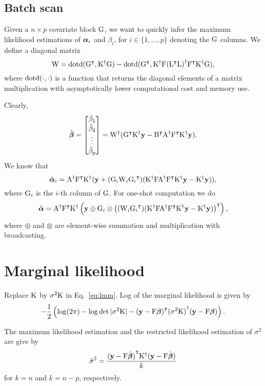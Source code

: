 \documentclass[twocolumn,draft]{article}
\begin{document}
\subsection{Batch scan}

Given a $n\times p$ covariate block $\mathrm{G}$, we want to quickly infer the
maximum likelihood estimations of $\boldsymbol{\alpha}_i$ and $\beta_i$, for
$i \in \{1, \dots, p\}$ denoting the $\mathrm{G}$ columns.
We define a diagonal matrix
\begin{equation*}
	\mathrm{W} = \mathrm{dotd} ({\mathrm{G}}^\intercal, {\mathrm{K}}^{\dagger}\mathrm{G}) -
	       \mathrm{dotd} ({\mathrm{G}}^\intercal, {\mathrm{K}}^{\dagger}\mathrm{F}
				 {({\mathrm{L}}^\intercal\mathrm{L})}^{\dagger}{\mathrm{F}}^\intercal{\mathrm{K}}^{\dagger}\mathrm{G}),
\end{equation*}
where $\mathrm{dotd} (\cdot, \cdot)$ is a function that returns the diagonal elements
of a matrix multiplication with asymptotically lower computational cost and
memory use.

Clearly,
\begin{equation*}
	\hat{\boldsymbol{\beta}} =
	\begin{bmatrix}
		\hat\beta_1 \\
		\hat\beta_2 \\
		\vdots \\
		\hat\beta_p
	\end{bmatrix}
	= {\mathrm{W}}^{\dagger}({\mathrm{G}}^\intercal{\mathrm{K}}^{\dagger}\mathbf{y}
	-{\mathrm{B}}^\intercal{\mathrm{A}}^{\dagger}{\mathrm{F}}^\intercal{\mathrm{K}}^{\dagger}\mathbf{y}).
\end{equation*}
We know that
\begin{equation*}
	\hat{\boldsymbol{\alpha}}_i = {\mathrm{A}}^{\dagger}{\mathrm{F}}^\intercal{\mathrm{K}}^{\dagger}
	(\mathbf{y} + (\mathrm{G}_i \mathrm{W}_i {\mathrm{G}_i}^\intercal)
	({\mathrm{K}}^{\dagger}\mathrm{F}{\mathrm{A}}^{\dagger}{\mathrm{F}}^\intercal{\mathrm{K}}^{\dagger}\mathbf{y} - {\mathrm{K}}^{\dagger}\mathbf{y})),
\end{equation*}
where $\mathrm{G}_i$ is the $i$-th column of $\mathrm{G}$.
For one-shot computation we do
\begin{equation*}
	\hat{\boldsymbol{\alpha}} = {\mathrm{A}}^{\dagger}{\mathrm{F}}^\intercal{\mathrm{K}}^{\dagger}
	\left(\mathbf{y} \oplus \mathrm{G}_i \otimes
	{\left((\mathrm{W}_i {\mathrm{G}_i}^\intercal)
	  ({\mathrm{K}}^{\dagger}\mathrm{F}{\mathrm{A}}^{\dagger}{\mathrm{F}}^\intercal{\mathrm{K}}^{\dagger}\mathbf{y}- {\mathrm{K}}^{\dagger}\mathbf{y})\right)}^\intercal\right),
\end{equation*}
where $\oplus$ and $\otimes$ are element-wise summation and multiplication
with broadcasting.

\section{Marginal likelihood}

Replace $\mathrm{K}$ by $\sigma^2\mathrm{K}$ in Eq.~\eqref{eq:lmm}.
Log of the marginal likelihood is given by
\begin{equation*}
	-\frac{1}{2}\left(\log(2\pi) - \log\det|\sigma^2\mathrm{K}|
	- {(\mathbf{y} - \mathrm{F}\boldsymbol{\beta})}^\intercal {(\sigma^2\mathrm{K})}^{\dagger} (\mathbf{y} - \mathrm{F}\boldsymbol{\beta})\right).
\end{equation*}

The maximum likelihood estimation and the restricted likelihood estimation of
$\sigma^2$ are give by
\begin{equation*}
	\hat\sigma^2 = \frac{
		{(\mathbf{y} - \mathrm{F}\hat{\boldsymbol{\beta}})}^\intercal
			{\mathrm{K}}^{\dagger}
		(\mathbf{y} - \mathrm{F}\hat{\boldsymbol{\beta}})
	}{k}
\end{equation*}
for $k = n$ and $k = n - p$, respectively.

\printbibliography\
\end{document}
